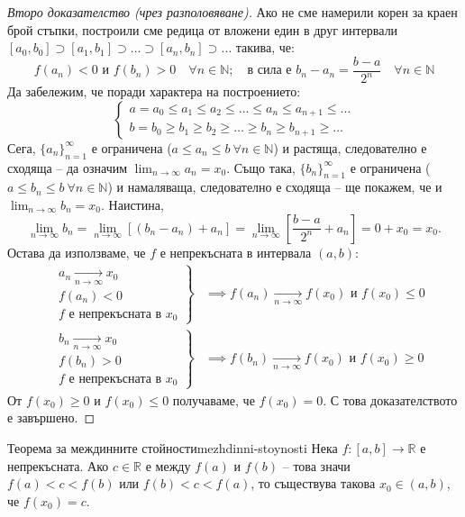 \begin{proof}[Второ доказателство (чрез разполовяване)]
Ако не сме намерили корен за краен брой стъпки, построили сме редица от вложени един в друг интервали $[a_0, b_0] \supset [a_1, b_1] \supset \dots \supset [a_n, b_n] \supset \dots$ такива, че:
\[
f(a_n) < 0 \text{ и } f(b_n) > 0\quad \forall n \in \mathbb{N}; \quad \text{в сила е } b_n - a_n = \frac{b - a}{2^n}\quad \forall n \in \mathbb{N}
\]
Да забележим, че поради характера на построението:
\[
\begin{cases}
a = a_0 \le a_1 \le a_2 \le \dots \le a_n \le a_{n+1} \le \dots \\
b = b_0 \ge b_1 \ge b_2 \ge \dots \ge b_n \ge b_{n+1} \ge \dots
\end{cases}
\]
Сега, $\{a_n\}_{n=1}^\infty$ е ограничена ($a \le a_n \le b\ \forall n \in \mathbb{N}$) и растяща, следователно е сходяща -- да означим $\lim_{n \to \infty} a_n = x_0$. Също така, $\{b_n\}_{n=1}^\infty$ е ограничена ($a \le b_n \le b\ \forall n \in \mathbb{N}$) и намаляваща, следователно е сходяща -- ще покажем, че и $\lim_{n \to \infty} b_n = x_0$. Наистина,
\[
\lim_{n \to \infty} b_n = \lim_{n \to \infty} [(b_n - a_n) + a_n] = \lim_{n \to \infty} \left[\frac{b - a}{2^n} + a_n\right] = 0 + x_0 = x_0.
\]
Остава да използваме, че $f$ е непрекъсната в интервала $(a, b)$:
\begin{align*}
\left.
\begin{aligned}
&a_n \xrightarrow[n \to \infty]{} x_0 \\
&f(a_n) < 0 \\
&f \text{ е непрекъсната в } x_0
\end{aligned}
\right\}
&\implies f(a_n) \xrightarrow[n \to \infty]{} f(x_0) \text{ и } f(x_0) \le 0 \\
\left.
\begin{aligned}
&b_n \xrightarrow[n \to \infty]{} x_0 \\
&f(b_n) > 0 \\
&f \text{ е непрекъсната в } x_0
\end{aligned}
\right\}
&\implies f(b_n) \xrightarrow[n \to \infty]{} f(x_0) \text{ и } f(x_0) \ge 0
\end{align*}
От $f(x_0) \ge 0$ и $f(x_0) \le 0$ получаваме, че $f(x_0) = 0$. С това доказателството е завършено.
\end{proof}

\begin{corollary}{Теорема за междинните стойности}{mezhdinni-stoynosti}
Нека $f : [a, b] \to \mathbb{R}$ е непрекъсната. Ако $c \in \mathbb{R}$ е между $f(a)$ и $f(b)$ -- това значи $f(a) < c < f(b)$ или $f(b) < c < f(a)$, то съществува такова $x_0 \in (a, b)$, че $f(x_0) = c$.
\end{corollary}

